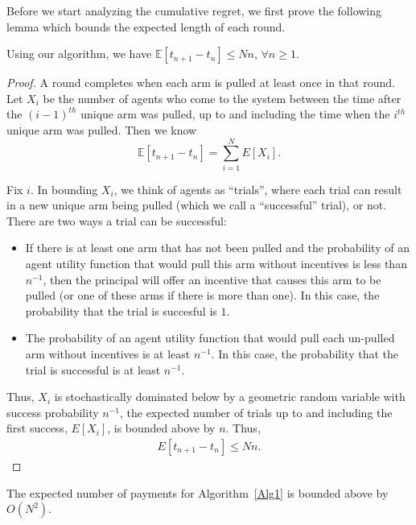 \documentclass[twoside,11pt]{article}
\begin{document}
Before we start analyzing the cumulative regret, we first prove the following lemma which bounds the expected length of each round.

\begin{lemma}
Using our algorithm, we have $\mathbb{E}[t_{n+1}-t_{n}]\leq Nn$, $\forall n\geq 1$.
\label{round:length}
\end{lemma}


\begin{proof}
	A round completes when each arm is pulled at least once in that round. Let $X_{i}$ be the number of agents who come to the system between the time after the $(i-1)^{th}$ unique arm was pulled, up to and including the time when the $i^{th}$ unique arm was pulled. Then we know 
\begin{equation*}
\mathbb{E}[t_{n+1}-t_{n}]=\sum_{i=1}^{N}E[X_{i}].
\end{equation*}


Fix $i$. In bounding $X_i$, we think of agents as ``trials'', where each trial can result in a new unique arm being pulled (which we call a ``successful'' trial), or not.  There are two ways a trial can be successful:
\begin{itemize}
\item If there is at least one arm that has not been pulled and the probability of an agent utility function that would pull this arm without incentives is less than $n^{-1}$, then the principal will offer an incentive that causes this arm to be pulled (or one of these arms if there is more than one). In this case, the probability that the trial is succesful is $1$.  
\item The probability of an agent utility function that would pull each un-pulled arm without incentives is at least $n^{-1}$. In this case, the probability that the trial is successful is at least $n^{-1}$.
\end{itemize}

Thus, $X_{i}$ is stochastically dominated below by a geometric random variable with success probability $n^{-1}$, the expected number of trials up to and including the first success, $E[X_i]$, is bounded above by $n$.  Thus,
\begin{align}
E[t_{n+1}-t_{n}]\leq Nn. \nonumber
\end{align}
\end{proof}


\begin{lemma}
The expected number of payments for Algorithm~\ref{Alg1} is bounded above by $O(N^2)$.
\label{lemma:numP}
\end{lemma}
\end{document}
